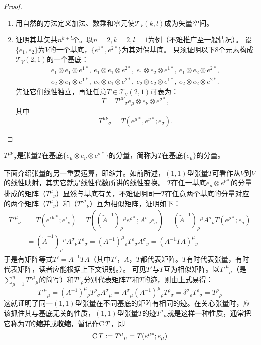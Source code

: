 \begin{proof}
\begin{enumerate}[（A）]
\item 用自然的方法定义加法、数乘和零元使$\mathscr{T}_V(k, l)$成为矢量空间。
\item 证明其基矢共$n^{k + l}$个。以$n = 2, k = 2, l = 1$为例（不难推广至一般情况）。
设$\{e_1, e_2\}$为$V$的一个基底，$\{e^{1*}, e^{2*}\}$为其对偶基底。
只须证明以下$8$个元素构成$\mathscr{T}_V(2, 1)$的一个基底：
$$\begin{aligned}
e_1 \otimes e_1 \otimes e^{1*}, ~ e_1 \otimes e_1 \otimes e^{2*}, ~ e_1 \otimes e_2 \otimes e^{1*}, ~ e_1 \otimes e_2 \otimes e^{2*}, \\
e_2 \otimes e_1 \otimes e^{1*}, ~ e_2 \otimes e_1 \otimes e^{2*}, ~ e_2 \otimes e_2 \otimes e^{1*}, ~ e_2 \otimes e_2 \otimes e^{2*}.
\end{aligned}$$
先证它们线性独立，再证任意$T \in \mathscr{T}_V(2, 1)$可表为：
$$T = T^{\mu\nu}{}_\sigma e_\mu \otimes e_\nu \otimes e^{\sigma*},$$
其中
$$T^{\mu\nu}{}_\sigma = T(e^{\mu*}, e^{\nu*}; e_\sigma).$$
\end{enumerate}
\end{proof}

\begin{note}
$T^{\mu\nu}{}_\sigma$是张量$T$在基底$\{e_\mu \otimes e_\nu \otimes e^{\sigma*}\}$的分量，简称为$T$在基底$\{e_\mu\}$的分量。
\end{note}

下面介绍张量的另一重要运算，即缩并。如前所述，$(1, 1)$型张量$T$可看作从$V$到$V$的线性映射，其实它就是线性代数所讲的线性变换。
$T$在任一基底${e_\mu \otimes e^{\nu*}}$的分量排成的矩阵（$T^\mu{}_\nu$）显然与基底有关，不难证明同一$T$在任意两个基底的分量对应的两个矩阵（$T^\mu{}_\nu$）和（$T'^\mu{}_\nu$）互为相似矩阵，证明如下：
$$\begin{aligned}
T'^\mu{}_\nu & = T(e'^{\mu*}; e'_\nu) = T((\tilde{A}^{-1})_\rho{}^\mu e^{\rho*};A^\sigma{}_\nu e_\sigma) = (\tilde{A}^{-1})_\rho{}^\mu A^\sigma{}_\nu T(e^{\rho*}; e_\sigma) \\
& = (\tilde{A}^{-1})_\rho{}^\mu A^\sigma{}_\nu T^\rho{}_\sigma = (A^{-1})^\mu{}_\rho T^\rho{}_\sigma A^\sigma{}_\nu = (A^{-1}TA)^\mu{}_\nu
\end{aligned}$$
于是有矩阵等式$T' = A^{-1}TA$（其中$T'$，$A$，$T$都代表矩阵。$T$有时代表张量，有时代表矩阵，读者应能根据上下文识别。）。
可见$T'$与$T$互为相似矩阵。以$T'^\mu{}_\mu$（是$\sum_{\mu = 1}^n T'^\mu{}_\mu$的简写）和$T^\rho{}_\rho$分别代表矩阵$T'$和$T$的迹，则由上式易得：
$$T'^\mu{}_\mu = (A^{-1})^\mu{}_\rho T^\rho{}_\sigma A^\sigma{}_\mu = A^\sigma{}_\mu(A^{-1})^\mu{}_\rho T^\rho{}_\sigma = \delta^\sigma{}_\rho T^\rho{}_\sigma = T^\rho{}_\rho$$
这就证明了同一$(1, 1)$型张量在不同基底的矩阵有相同的迹。在关心张量时，应该抓住其与基底无关的性质，$(1, 1)$型张量$T$的迹$T^\mu{}_\mu$就是这样一种性质，通常把它称为$T$的\textbf{缩并}或\textbf{收缩}，暂记作$\operatorname{C} T$，即
$$\operatorname{C} T := T^\mu{}_\mu = T(e^{\mu*}; e_\mu)$$

